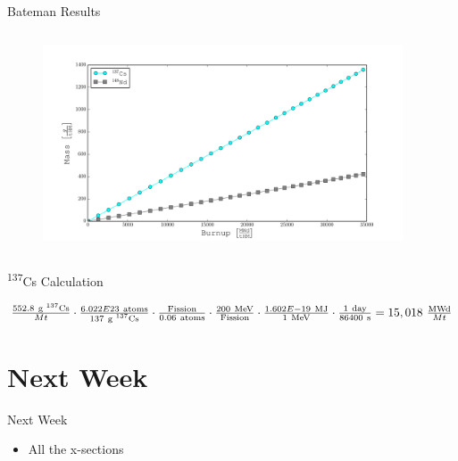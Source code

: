 \documentclass{beamer}
\newcommand{\tss}{\textsuperscript}
\begin{document}
\begin{frame}{Bateman Results}
  \begin{columns}
    \begin{column}{0.5\textwidth}
      \begin{figure}[H]
        \vspace*{-1cm}
        \begin{center}
          \includegraphics[scale = 0.4]{../../Calculations/Bateman/PlotBU/Plots/BurnCsComp_grams.pdf}
          \vspace{-0.5cm}
        \end{center}
      \end{figure}
    \end{column}
    \begin{column}{0.5\textwidth}
    \end{column}
  \end{columns}  
\end{frame}



\begin{frame}{\tss{137}Cs Calculation}
  \begin{center}
    $
    \frac{552.8\ \text{g \tss{137}Cs}}{Mt}\cdot
    \frac{6.022E23\ \text{atoms}}{137\ \text{g \tss{137}Cs}}\cdot
    \frac{\text{Fission}}{0.06\ \text{atoms}}\cdot
    \frac{200\ \text{MeV}}{\text{Fission}}\cdot
    \frac{1.602E-19\ \text{MJ}}{1\ \text{MeV}}\cdot
    \frac{1\ \text{day}}{86400\ \text{s}}=15,018\ \frac{\text{MWd}}{Mt}$
  \end{center}
\end{frame}



\section{Next Week}
\begin{frame}{Next Week}
  \begin{itemize}
  \item{All the x-sections}
  \end{itemize}
\end{frame}
\end{document}
